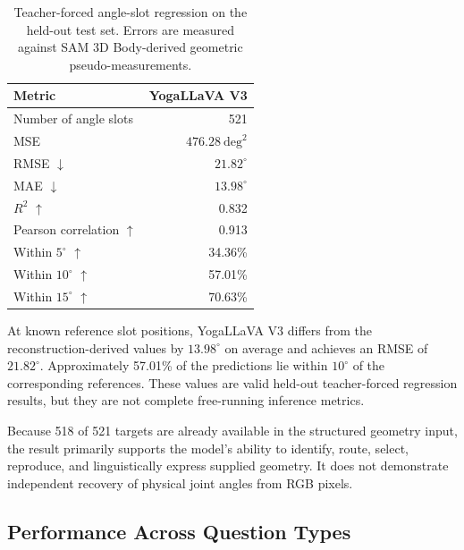 \begin{table}[t]
    \centering
    \caption{Teacher-forced angle-slot regression on the held-out test
    set. Errors are measured against SAM 3D Body-derived geometric
    pseudo-measurements.}
    \label{tab:overall_results}
    \begin{tabular}{lr}
        \toprule
        \textbf{Metric} & \textbf{YogaLLaVA V3} \\
        \midrule
        Number of angle slots & 521 \\
        MSE & $476.28~\mathrm{deg}^2$ \\
        RMSE $\downarrow$ & $21.82^\circ$ \\
        MAE $\downarrow$ & $13.98^\circ$ \\
        $R^2$ $\uparrow$ & 0.832 \\
        Pearson correlation $\uparrow$ & 0.913 \\
        Within $5^\circ$ $\uparrow$ & 34.36\% \\
        Within $10^\circ$ $\uparrow$ & 57.01\% \\
        Within $15^\circ$ $\uparrow$ & 70.63\% \\
        \bottomrule
    \end{tabular}
\end{table}

At known reference slot positions, YogaLLaVA V3 differs from the
reconstruction-derived values by $13.98^\circ$ on average and achieves
an RMSE of $21.82^\circ$. Approximately 57.01\% of the predictions lie
within $10^\circ$ of the corresponding references. These values are
valid held-out teacher-forced regression results, but they are not
complete free-running inference metrics.

Because 518 of 521 targets are already available in the structured
geometry input, the result primarily supports the model's ability to
identify, route, select, reproduce, and linguistically express supplied
geometry. It does not demonstrate independent recovery of physical
joint angles from RGB pixels.

\subsection{Performance Across Question Types}
\label{sec:path_results}

